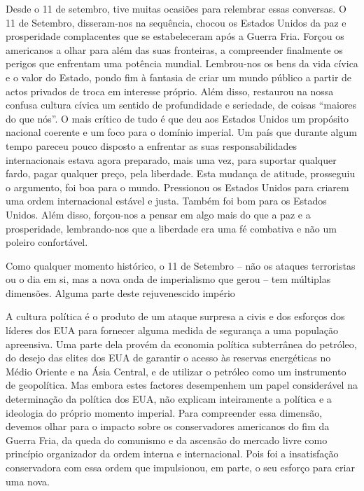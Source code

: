 Desde o {\color{blue}11} de setembro, tive muitas ocasiões para relembrar essas conversas. O {\color{blue}11} de Setembro, disseram-nos na sequência, chocou os Estados Unidos da paz e prosperidade complacentes que se estabeleceram após a Guerra Fria. Forçou os americanos a olhar para além das suas fronteiras, a compreender finalmente os perigos que enfrentam uma potência mundial. Lembrou-nos os bens da vida cívica e o valor do Estado, pondo fim à fantasia de criar um mundo público a partir de actos privados de troca em interesse próprio. Além disso, restaurou na nossa confusa cultura cívica um sentido de profundidade e seriedade, de coisas “maiores do que nós”. O mais crítico de tudo é que deu aos Estados Unidos um propósito nacional coerente e um foco para o domínio imperial. Um país que durante algum tempo pareceu pouco disposto a enfrentar as suas responsabilidades internacionais estava agora preparado, mais uma vez, para suportar qualquer fardo, pagar qualquer preço, pela liberdade. Esta mudança de atitude, prosseguiu o argumento, foi boa para o mundo. Pressionou os Estados Unidos para criarem uma ordem internacional estável e justa. Também foi bom para os Estados Unidos. Além disso, forçou-nos a pensar em algo mais do que a paz e a prosperidade, lembrando-nos que a liberdade era uma fé combativa e não um poleiro confortável.
 \par 
Como qualquer momento histórico, o {\color{blue}11} de Setembro – não os ataques terroristas ou o dia em si, mas a nova onda de imperialismo que gerou – tem múltiplas dimensões. Alguma parte deste rejuvenescido império
 \par 
A cultura política é o produto de um ataque surpresa a civis e dos esforços dos líderes dos EUA para fornecer alguma medida de segurança a uma população apreensiva. Uma parte dela provém da economia política subterrânea do petróleo, do desejo das elites dos EUA de garantir o acesso às reservas energéticas no Médio Oriente e na Ásia Central, e de utilizar o petróleo como um instrumento de geopolítica. Mas embora estes factores desempenhem um papel considerável na determinação da política dos EUA, não explicam inteiramente a política e a ideologia do próprio momento imperial. Para compreender essa dimensão, devemos olhar para o impacto sobre os conservadores americanos do fim da Guerra Fria, da queda do comunismo e da ascensão do mercado livre como princípio organizador da ordem interna e internacional. Pois foi a insatisfação conservadora com essa ordem que impulsionou, em parte, o seu esforço para criar uma nova.
 \par 
